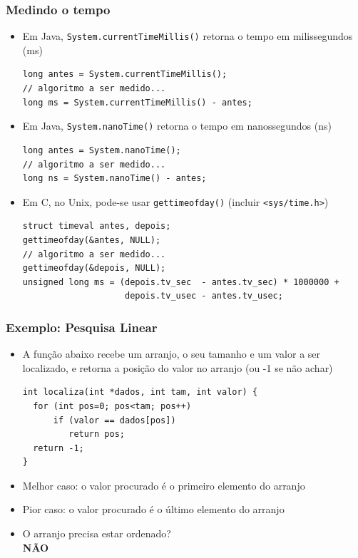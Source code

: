 \documentclass[aspectratio=169]{beamer}
\begin{document}
\begin{frame}[fragile]\frametitle{Medindo o tempo}
\begin{itemize}
	\item Em Java, \texttt{System.currentTimeMillis()} retorna o tempo em milissegundos (ms)
{\scriptsize
\begin{lstlisting}
long antes = System.currentTimeMillis();
// algoritmo a ser medido...
long ms = System.currentTimeMillis() - antes;
\end{lstlisting}}
	\item Em Java, \texttt{System.nanoTime()} retorna o tempo em nanossegundos (ns)
{\scriptsize
\begin{lstlisting}
long antes = System.nanoTime();
// algoritmo a ser medido...
long ns = System.nanoTime() - antes;
\end{lstlisting}}
	\item Em C, no Unix, pode-se usar \texttt{gettimeofday()} (incluir \texttt{<sys/time.h>})
{\scriptsize\begin{lstlisting}
struct timeval antes, depois;
gettimeofday(&antes, NULL);
// algoritmo a ser medido...
gettimeofday(&depois, NULL);
unsigned long ms = (depois.tv_sec  - antes.tv_sec) * 1000000 +
                    depois.tv_usec - antes.tv_usec;
\end{lstlisting}}

\end{itemize}
\end{frame}

\begin{frame}[fragile]\frametitle{Exemplo: Pesquisa Linear}
\begin{itemize}
	\item A função abaixo recebe um arranjo, o seu tamanho e um valor a ser localizado, e retorna a posição do valor no arranjo (ou -1 se não achar)
{\scriptsize
\begin{lstlisting}
int localiza(int *dados, int tam, int valor) {
  for (int pos=0; pos<tam; pos++)
      if (valor == dados[pos])
         return pos;
  return -1;
}
\end{lstlisting}}
	\item Melhor caso: o valor procurado é o primeiro elemento do arranjo
	\item Pior caso: o valor procurado é o último elemento do arranjo
	\item O arranjo precisa estar ordenado?\\
	\pause
	\textbf{NÃO}
\end{itemize}
\end{frame}
\end{document}
